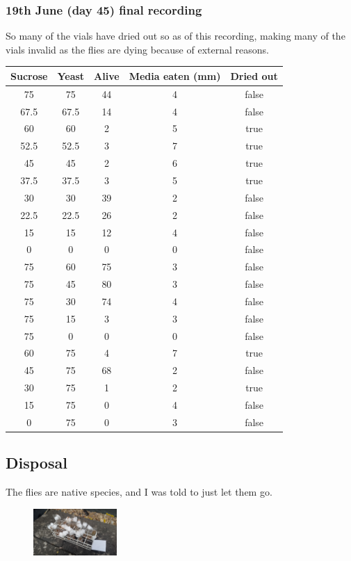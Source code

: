 \documentclass{article}
\begin{document}
\subsubsection{19th June (day 45) final recording}

So many of the vials have dried out so as of this recording, making many of the vials invalid as the flies are dying because of external reasons.\\

{
\centering
\begin{tabular}{|c|c|c|c|c|}
  \hline
  Sucrose & Yeast & Alive & Media eaten (mm) & Dried out\\
  \hline
  \hline
  75 & 75 & 44 & 4 & false\\
  67.5 & 67.5 & 14 & 4 & false\\
  60 & 60 & 2 & 5 & true\\
  52.5 & 52.5 & 3 & 7 & true\\
  45 & 45 & 2 & 6 & true\\
  37.5 & 37.5 & 3 & 5 & true\\
  30 & 30 & 39 & 2 & false\\
  22.5 & 22.5 & 26 & 2 & false\\
  15 & 15 & 12 & 4 & false\\
  0 & 0 & 0 & 0 & false\\
  \hline
  75 & 60 & 75 & 3 & false\\
  75 & 45 & 80 & 3 & false\\
  75 & 30 & 74 & 4 & false\\
  75 & 15 & 3 & 3 & false\\
  75 & 0 & 0 & 0 & false\\
  \hline
  60 & 75 & 4 & 7 & true\\
  45 & 75 & 68 & 2 & false\\
  30 & 75 & 1 & 2 & true\\
  15 & 75 & 0 & 4 & false\\
  0 & 75 & 0 & 3 & false\\
  \hline
\end{tabular}
\par
}

\subsection{Disposal}

The flies are native species, and I was told to just let them go.

\begin{figure}[ht]
  \centering
  \includegraphics[width=120px]{letemgo}
\end{figure}
\end{document}
